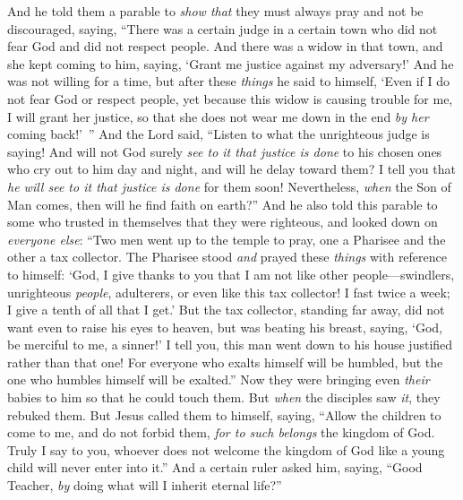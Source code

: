 \begin{biblechapter} %
 And he told them a parable to \textit{show that} they must always pray and not be discouraged,
\verse saying, “There was a certain judge in a certain town who did not fear God and did not respect people.
\verse And there was a widow in that town, and she kept coming to him, saying, ‘Grant me justice against my adversary!’
\verse And he was not willing for a time, but after these \textit{things} he said to himself, ‘Even if I do not fear God or respect people,
\verse yet because this widow is causing trouble for me, I will grant her justice, so that she does not wear me down in the end \textit{by her} coming back!’ ”
\verse And the Lord said, “Listen to what the unrighteous judge is saying!
\verse And will not God surely \textit{see to it that justice is done} to his chosen ones who cry out to him day and night, and will he delay toward them?
\verse I tell you that \textit{he will see to it that justice is done} for them soon! Nevertheless, \textit{when} the Son of Man comes, then will he find faith on earth?”
 And he also told this parable to some who trusted in themselves that they were righteous, and looked down on \textit{everyone else}:
\verse “Two men went up to the temple to pray, one a Pharisee and the other a tax collector.
\verse The Pharisee stood \textit{and} prayed these \textit{things} with reference to himself: ‘God, I give thanks to you that I am not like other people—swindlers, unrighteous \textit{people}, adulterers, or even like this tax collector!
\verse I fast twice a week; I give a tenth of all that I get.’
\verse But the tax collector, standing far away, did not want even to raise his eyes to heaven, but was beating his breast, saying, ‘God, be merciful to me, a sinner!’
\verse I tell you, this man went down to his house justified rather than that one! For everyone who exalts himself will be humbled, but the one who humbles himself will be exalted.”
 Now they were bringing even \textit{their} babies to him so that he could touch them. But \textit{when} the disciples saw \textit{it}, they rebuked them.
\verse But Jesus called them to himself, saying, “Allow the children to come to me, and do not forbid them, \textit{for to such belongs} the kingdom of God.
\verse Truly I say to you, whoever does not welcome the kingdom of God like a young child will never enter into it.”
 And a certain ruler asked him, saying, “Good Teacher, \textit{by} doing what will I inherit eternal life?”

\end{biblechapter}

